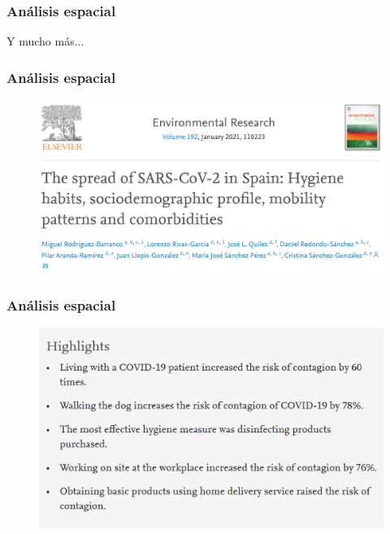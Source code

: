 \documentclass{beamer}
\begin{document}

\begin{frame}\frametitle{Análisis espacial}
	\centering
	\huge {Y mucho más...}
\end{frame}


\begin{frame}\frametitle{Análisis espacial}
	\begin{figure}
		\centering
		\includegraphics[width=.9\textwidth]{images/covid1.png}
	\end{figure}
\end{frame}


\begin{frame}\frametitle{Análisis espacial}
	\begin{figure}
		\centering
		\includegraphics[width=.9\textwidth]{images/covid2.png}
	\end{figure}
\end{frame}

\end{document}
